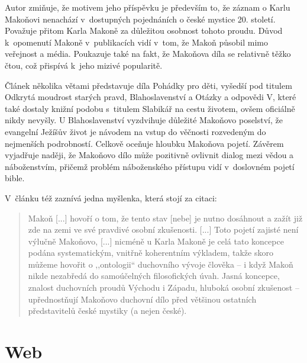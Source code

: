 Autor zmiňuje, že motivem jeho příspěvku je především to, že záznam o Karlu Makoňovi
nenachází v~dostupných pojednáních o české mystice 20. století. Považuje přitom
Karla Makoně za důležitou osobnost tohoto proudu. Důvod k~opomenutí Makoně
v~publikacích vidí v~tom, že Makoň působil mimo veřejnost a média. Poukazuje
také na fakt, že Makoňova díla se relativně těžko čtou, což přispívá k~jeho
mizivé popularitě.

Článek několika větami představuje díla Pohádky pro děti, vyšedší pod titulem
Odkrytá moudrost starých pravd\cite{makon1992odkryta},
Blahoslavenství\cite{makon2000blahoslavenstvi} a Otázky a odpovědi V, které
také dostaly knižní podobu s~titulem Slabikář na cestu životem, ovšem oficiálně
nikdy nevyšly. U Blahoslavenství vyzdvihuje důležité Makoňovo poselství, že
evangelní Ježíšův život je návodem na vstup do věčnosti rozvedeným do nejmenších
podrobností. Celkově oceňuje hloubku Makoňova pojetí. Závěrem vyjadřuje naději,
že Makoňovo dílo může pozitivně ovlivnit dialog mezi vědou a náboženstvím,
přičemž problém náboženského přístupu vidí v~doslovném pojetí bible.

V~článku též zaznívá jedna myšlenka, která stojí za citaci:
\begin{quote}
Makoň [...] hovoří o tom, že tento stav [nebe] je
nutno dosáhnout a zažít již zde na zemi ve
své pravdivé osobní zkušenosti. [...]
Toto pojetí zajisté není výlučně Makoňovo, [...]
nicméně u Karla Makoně je celá tato koncepce podána systematickým, vnitřně
koherentním výkladem, takže skoro můžeme hovořit o ,,ontologii`` duchovního
vývoje člověka -- i když Makoň nikde nezabředá do samoúčelných filosofických
úvah. Jasná koncepce, znalost duchovních proudů Východu i Západu, hluboká osobní
zkušenost -- upřednostňují Makoňovo duchovní dílo před většinou ostatních
představitelů české mystiky (a nejen české).
\end{quote}

\section{Web}

